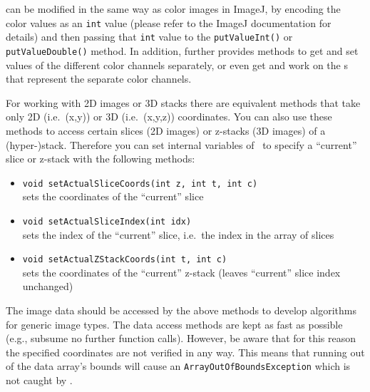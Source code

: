  can be modified in the same way as color images in ImageJ, by
encoding the color values as an {\tt int} value (please refer to the ImageJ documentation for details)
and then passing that {\tt int} value to the {\tt putValueInt()} or {\tt putValueDouble()} method. 
In addition,  further provides methods to get
and set values of the different color channels separately, or even get and work
on the s that represent the separate color channels.

For working with 2D images or 3D stacks there are equivalent methods that take
only 2D (i.e.~(x,y)) or 3D (i.e.~(x,y,z)) coordinates. You can also use these methods to access
certain slices (2D images) or z-stacks (3D images) of a (hyper-)stack. Therefore
you can set internal variables of \mtbimg~to specify a ``current'' slice or
z-stack with the following methods:
\begin{itemize}
  \item {\tt void setActualSliceCoords(int z, int t, int c)}\\
  		sets the coordinates of the ``current'' slice
  \item {\tt void setActualSliceIndex(int idx)}\\
  		sets the index of the ``current'' slice, i.e.~the index in the array of slices
  \item {\tt void setActualZStackCoords(int t, int c)}\\
  		sets the coordinates of the ``current'' z-stack (leaves ``current''
  		slice index unchanged)
\end{itemize}

The image data should be accessed by the above methods to develop algorithms for
generic image types. The data access methods are kept as fast as possible 
(e.g., subsume no further function calls). However, be aware that for this reason the
specified coordinates are not verified in any way. This means that running out of the
data array's bounds will cause an {\tt ArrayOutOfBoundsException} which is not caught by \mitobo.


